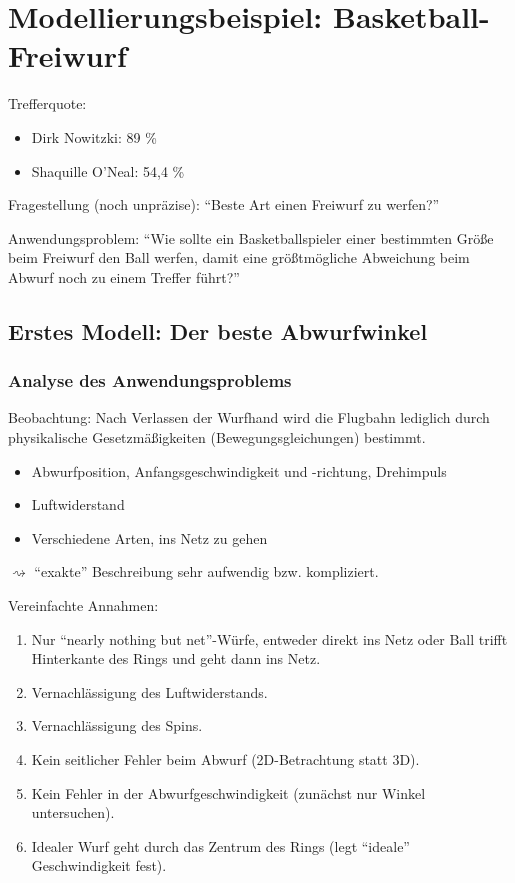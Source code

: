 \chapter{Modellierungsbeispiel: Basketball-Freiwurf}
Trefferquote:
\begin{itemize}
\item Dirk Nowitzki: 89 \%
\item Shaquille O'Neal: 54,4 \%
\end{itemize}
Fragestellung (noch unpräzise): ``Beste Art einen Freiwurf zu werfen?''

Anwendungsproblem: ``Wie sollte ein Basketballspieler einer bestimmten Größe
beim Freiwurf den Ball werfen, damit eine größtmögliche Abweichung beim Abwurf
noch zu einem Treffer führt?''

\section{Erstes Modell: Der beste Abwurfwinkel}
\subsection{Analyse des Anwendungsproblems}
Beobachtung: Nach Verlassen der Wurfhand wird die Flugbahn lediglich durch
physikalische Gesetzmäßigkeiten (Bewegungsgleichungen) bestimmt.
\begin{itemize}
\item Abwurfposition, Anfangsgeschwindigkeit und -richtung, Drehimpuls
\item Luftwiderstand
\item Verschiedene Arten, ins Netz zu gehen
\end{itemize}
$\rightsquigarrow$ ``exakte'' Beschreibung sehr aufwendig bzw. kompliziert.

Vereinfachte Annahmen:
\begin{enumerate}
\item Nur ``nearly nothing but net''-Würfe, entweder direkt ins Netz oder Ball
  trifft Hinterkante des Rings und geht dann ins Netz.
\item Vernachlässigung des Luftwiderstands.
\item Vernachlässigung des Spins.
\item Kein seitlicher Fehler beim Abwurf (2D-Betrachtung statt 3D).
\item Kein Fehler in der Abwurfgeschwindigkeit (zunächst nur Winkel
  untersuchen).
\item Idealer Wurf geht durch das Zentrum des Rings (legt ``ideale''
  Geschwindigkeit fest).
\end{enumerate}

